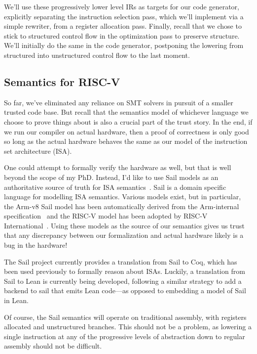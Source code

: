 \documentclass[a4paper]{scrartcl}
\begin{document}
We'll use these progressively lower level IRs as targets for our code
generator, explicitly separating the instruction selection pass, which
we'll implement via a simple rewriter, from a register allocation pass.
Finally, recall that we chose to stick to structured control flow in the
optimization pass to preserve structure. We'll initially do the same in the code
generator, postponing the lowering from structured into unstructured
control flow to the last moment. 

\subsection{Semantics for RISC-V}

So far, we've eliminated any reliance on SMT solvers in pursuit of a
smaller trusted code base. But recall that the semantics model of
whichever language we choose to prove things about is also a crucial
part of the trust story. In the end, if we run our compiler on actual
hardware, then a proof of correctness is only good so long as the actual
hardware behaves the same as our model of the instruction set
architecture (ISA).

One could attempt to formally verify the hardware as well, but that is
well beyond the scope of my PhD. Instead, I'd like to use Sail models as
an authoritative source of truth for ISA semantics~\cite{armstrongISASemanticsARMv8a2019}.
Sail is a domain specific
language for modelling ISA semantics. Various models exist, but in
particular, the Arm-v8 Sail model has been automatically derived from the Arm-internal 
specification~\cite{reidTrustworthySpecificationsARM} and the RISC-V model has
been adopted by RISC-V International~\cite{sammlerIslarisVerificationMachine2022}. 
Using these models as the source of our semantics gives us trust that any discrepancy
between our formalization and actual hardware likely is a bug in the
hardware!

The Sail project currently provides a translation from Sail to Coq,
which has been used previously to formally reason about ISAs. Luckily, a
translation from Sail to Lean is currently being developed, following a
similar strategy to add a backend to sail that emits Lean code---as
opposed to embedding a model of Sail in Lean.

Of course, the Sail semantics will operate on traditional assembly, with
registers allocated and unstructured branches. This should not be a
problem, as lowering a single instruction at any of the progressive
levels of abstraction down to regular assembly should not be difficult.
\end{document}
